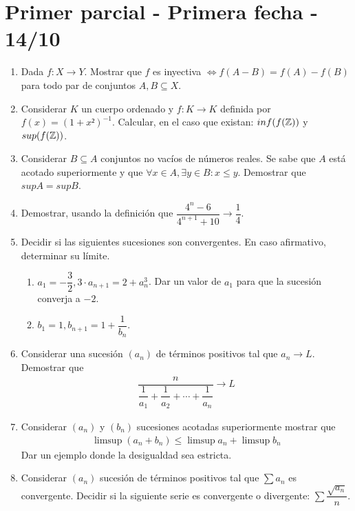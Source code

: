 \section{Primer parcial - Primera fecha - 14/10}

\begin{enumerate}
  \item Dada $f: X \to Y$. Mostrar que $f$ es inyectiva $\iff f(A-B) = f(A) - f(B)$ para todo par de conjuntos $A, B \subseteq X$.
  \item Considerar $K$ un cuerpo ordenado y $f: K \to K$ definida por $f(x) = (1+x²)^{-1}$. Calcular, en el caso que existan: $inf(f(\mathbb{Z}))$ y $sup(f(\mathbb{Z}))$.
  \item Considerar $B \subseteq A$ conjuntos no vacíos de números reales. Se sabe que $A$ está acotado superiormente y que $\forall x \in A, \exists y \in B : x \leq y$. Demostrar que $sup A = sup B$.
  \item Demostrar, usando la definición que $\dfrac{4^n - 6}{4^{n+1}+10} \to \dfrac{1}{4}$.
  \item Decidir si las siguientes sucesiones son convergentes. En caso afirmativo, determinar su límite. \begin{enumerate}
          \item $a_1 = -\dfrac{3}{2}, 3 \cdot a_{n+1} = 2 + a_n^3$. Dar un valor de $a_1$ para que la sucesión converja a $-2$.
          \item $b_1 = 1, b_{n+1} = 1 + \dfrac{1}{b_n}$.
        \end{enumerate}
  \item Considerar una sucesión $(a_n)$ de términos positivos tal que $a_n \to L$. Demostrar que \begin{align*} \dfrac{n}{\dfrac{1}{a_1} + \dfrac{1}{a_2} + \cdots + \dfrac{1}{a_n}} \to L \end{align*}
  \item Considerar $(a_n)$ y $(b_n)$ sucesiones acotadas superiormente mostrar que \begin{align*} \limsup(a_n + b_n) \leq \limsup a_n + \limsup b_n \end{align*} Dar un ejemplo donde la desigualdad sea estricta.
  \item Considerar $(a_n)$ sucesión de términos positivos tal que $\sum a_n$ es convergente. Decidir si la siguiente serie es convergente o divergente: $\sum \dfrac{\sqrt{a_n}}{n}$.
\end{enumerate}

\clearpage

